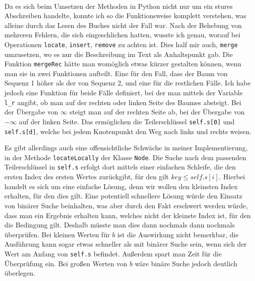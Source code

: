 \\
Da es sich beim Umsetzen der Methoden in Python nicht nur um ein stures Abschreiben handelte, konnte ich so die Funktionsweise komplett verstehen, was alleine durch das Lesen des Buches nicht der Fall war. Nach der Behebung von mehreren Fehlern, die sich eingeschlichen hatten, wusste ich genau, worauf bei Operationen \texttt{locate}, \texttt{insert}, \texttt{remove} zu achten ist. Dies half mir auch, \texttt{merge} umzusetzen, wo es nur die Beschreibung im Text als Anhaltspunkt gab. Die Funktion \texttt{mergeRec} hätte man womöglich etwas kürzer gestalten können, wenn man sie in zwei Funktionen aufteilt. Eine für den Fall, dass der Baum von Sequenz 1 höher als der von Sequenz 2, und eine für die restlichen Fälle. Ich habe jedoch eine Funktion für beide Fälle definiert, bei der man mittels der Variable \texttt{l\_r} angibt, ob man auf der rechten oder linken Seite des Baumes absteigt. Bei der Übergabe von $\infty$ steigt man auf der rechten Seite ab, bei der Übergabe von $-\infty$ auf der linken Seite. Das ermöglichen die Teilerschlüssel \texttt{self.s[0]} und \texttt{self.s[d]}, welche bei jedem Knotenpunkt den Weg nach links und rechts weisen.
\par
Es gibt allerdings auch eine offensichtliche Schwäche in meiner Implementierung, in der Methode \texttt{locateLocally} der Klasse \texttt{Node}. Die Suche nach dem passenden Teilerschlüssel in \texttt{self.s} erfolgt dort mittels einer einfachen Schleife, die den ersten Index des ersten Wertes zurückgibt, für den gilt \texttt{$key \leq self.s[i]$}. Hierbei handelt es sich um eine einfache Lösung, denn wir wollen den kleinsten Index erhalten, für den dies gilt. Eine potentiell schnellere Lösung würde den Einsatz von binärer Suche beinhalten, was aber durch den Fakt erschwert werden würde, dass man ein Ergebnis erhalten kann, welches nicht der kleinste Index ist, für den die Bedingung gilt. Deshalb müsste man dies dann nochmals dann nochmals überprüfen. Bei kleinen Werten für $b$ ist die Auswirkung nicht bemerkbar, die Ausführung kann sogar etwas schneller als mit binärer Suche sein, wenn sich der Wert am Anfang von \texttt{self.s} befindet. Außerdem spart man Zeit für die Überprüfung ein. Bei großen Werten von $b$ wäre binäre Suche jedoch deutlich überlegen.
\par
